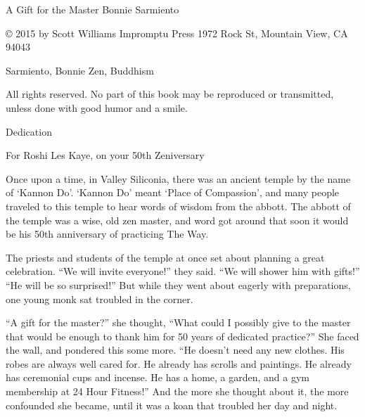 




A Gift for the Master
Bonnie Sarmiento















© 2015 by Scott Williams Impromptu Press
1972 Rock St, Mountain View, CA 94043

Sarmiento, Bonnie
Zen, Buddhism

All rights reserved. No part of this book may be reproduced or transmitted, unless done with good humor and a smile.














Dedication

For Roshi Les Kaye, 
on your 50th Zeniversary













Once upon a time, in Valley Siliconia, there was an ancient temple by the name of ‘Kannon Do’. ‘Kannon Do’ meant ‘Place of Compassion’, and many people traveled to this temple to hear words of wisdom from the abbott. The abbott of the temple was a wise, old zen master, and word got around that soon it would be his 50th anniversary of practicing The Way.

The priests and students of the temple at once set about planning a great celebration. “We will invite everyone!” they said. “We will shower him with gifts!” “He will be so surprised!” But while they went about eagerly with preparations, one young monk sat troubled in the corner.

“A gift for the master?” she thought, “What could I possibly give to the master that would be enough to thank him for 50 years of dedicated practice?” She faced the wall, and pondered this some more. “He doesn’t need any new clothes. His robes are always well cared for. He already has scrolls and paintings. He already has ceremonial cups and incense. He has a home, a garden, and a gym membership at 24 Hour Fitness!” And the more she thought about it, the more confounded she became, until it was a koan that troubled her day and night. 


